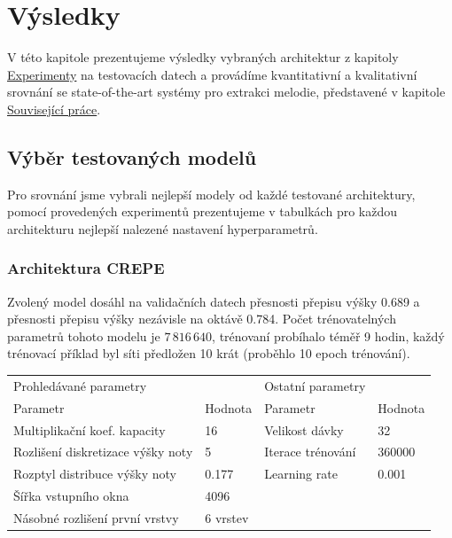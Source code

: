 \chapter{Výsledky}

V této kapitole prezentujeme výsledky vybraných architektur z kapitoly \hyperref[chap:experimenty]{Experimenty} na testovacích datech a provádíme kvantitativní a kvalitativní srovnání se state-of-the-art systémy pro extrakci melodie, představené v kapitole \hyperref[chap:souvisejici]{Související práce}.

\section{Výběr testovaných modelů}

Pro srovnání jsme vybrali nejlepší modely od každé testované architektury, pomocí provedených experimentů prezentujeme v tabulkách pro každou architekturu nejlepší nalezené nastavení hyperparametrů.

\subsection{Architektura CREPE}

Zvolený model dosáhl na validačních datech přesnosti přepisu výšky 0.689 a přesnosti přepisu výšky nezávisle na oktávě 0.784. Počet trénovatelných parametrů tohoto modelu je $7\,816\,640$, trénovaní probíhalo téměř 9 hodin, každý trénovací příklad byl síti předložen 10 krát (proběhlo 10 epoch trénování).

\begin{table}[h!]
\begin{tabular}{llll}
\hline
\toprule
Prohledávané parametry               &          & Ostatní parametry &         \\
Parametr                             & Hodnota  & Parametr          & Hodnota \\
\midrule
Multiplikační koef. kapacity         & 16       & Velikost dávky    & 32      \\
Rozlišení diskretizace výšky noty    & 5        & Iterace trénování & 360000  \\
Rozptyl distribuce výšky noty & 0.177    & Learning rate     & 0.001   \\
Šířka vstupního okna                 & 4096     &                   &         \\
Násobné rozlišení první vrstvy       & 6 vrstev &                   &         \\
\bottomrule
\end{tabular}
\end{table}

